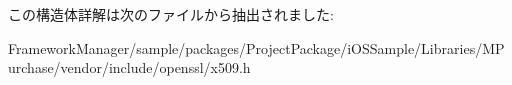 この構造体詳解は次のファイルから抽出されました\+:\begin{DoxyCompactItemize}
\item 
Framework\+Manager/sample/packages/\+Project\+Package/i\+O\+S\+Sample/\+Libraries/\+M\+Purchase/vendor/include/openssl/x509.\+h\end{DoxyCompactItemize}
